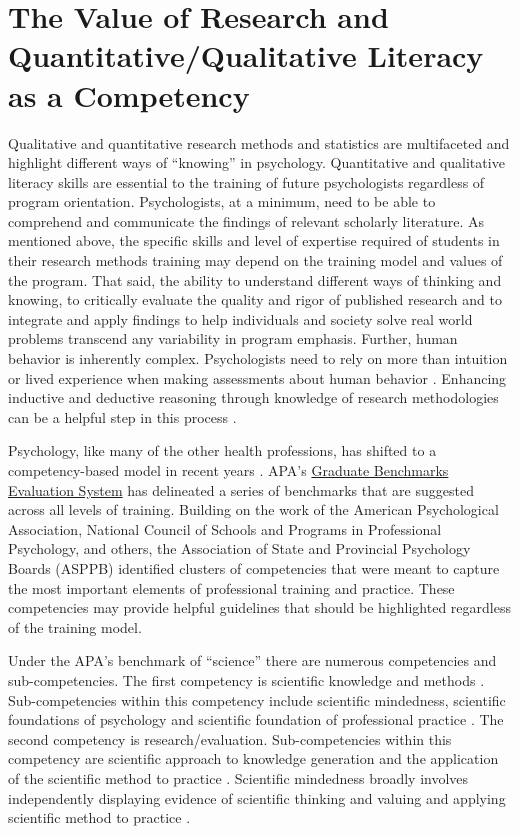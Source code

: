 \documentclass[
  11pt,
]{book}
\begin{document}
\section{The Value of Research and Quantitative/Qualitative Literacy as a Competency}\label{the-value-of-research-and-quantitativequalitative-literacy-as-a-competency}

Qualitative and quantitative research methods and statistics are multifaceted and highlight different ways of ``knowing'' in psychology. Quantitative and qualitative literacy skills are essential to the training of future psychologists regardless of program orientation. Psychologists, at a minimum, need to be able to comprehend and communicate the findings of relevant scholarly literature. As mentioned above, the specific skills and level of expertise required of students in their research methods training may depend on the training model and values of the program. That said, the ability to understand different ways of thinking and knowing, to critically evaluate the quality and rigor of published research and to integrate and apply findings to help individuals and society solve real world problems transcend any variability in program emphasis. Further, human behavior is inherently complex. Psychologists need to rely on more than intuition or lived experience when making assessments about human behavior \citep{dumper_psychological_2019}. Enhancing inductive and deductive reasoning through knowledge of research methodologies can be a helpful step in this process \citep{dumper_psychological_2019}.

Psychology, like many of the other health professions, has shifted to a competency-based model in recent years \citep{kaslow_competency_2009}. APA's \href{https://www.apa.org/ed/graduate/benchmarks-evaluation-system}{Graduate Benchmarks Evaluation System} has delineated a series of benchmarks that are suggested across all levels of training. Building on the work of the American Psychological Association, National Council of Schools and Programs in Professional Psychology, and others, the Association of State and Provincial Psychology Boards (ASPPB) identified clusters of competencies that were meant to capture the most important elements of professional training and practice. These competencies may provide helpful guidelines that should be highlighted regardless of the training model.

Under the APA's benchmark of ``science'' there are numerous competencies and sub-competencies. The first competency is scientific knowledge and methods \citep{noauthor_benchmarks_2012}. Sub-competencies within this competency include scientific mindedness, scientific foundations of psychology and scientific foundation of professional practice \citep{noauthor_benchmarks_2012}. The second competency is research/evaluation. Sub-competencies within this competency are scientific approach to knowledge generation and the application of the scientific method to practice \citep{noauthor_benchmarks_2012}. Scientific mindedness broadly involves independently displaying evidence of scientific thinking and valuing and applying scientific method to practice \citep{noauthor_benchmarks_2012}.
\end{document}
